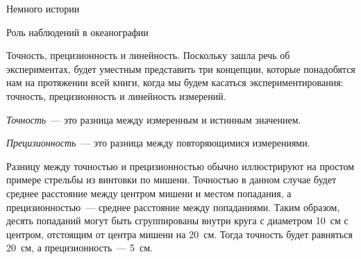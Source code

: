 \begin{chapter}{Немного истории}
\begin{section}{Роль наблюдений в океанографии}
\begin{paragraph}{Точность, прецизионность и линейность.}
Поскольку зашла речь об экспериментах, будет уместным представить 
три концепции, которые понадобятся нам на протяжении всей книги, 
когда мы будем касаться экспериментирования: точность, прецизионность
и линейность измерений.
%

\emph{Точность}~--- это разница между измеренным и истинным значением.
%

\emph{Прецизионность}~--- это разница между повторяющимися измерениями.%
%

Разницу между точностью и прецизионностью обычно иллюстрируют на
простом примере стрельбы из винтовки по мишени. Точностью в данном случае 
будет среднее расстояние между центром мишени и местом попадания, 
а прецизионностью~--- среднее расстояние между попаданиями. 
Таким образом, десять попаданий
могут быть сгруппированы внутри круга с диаметром 10~см с центром,
отстоящим от центра мишени на 20~см. Тогда точность будет равняться 20~см, 
а прецизионность~--- 5~см.
%



\end{paragraph}
\end{section}
\end{chapter}
